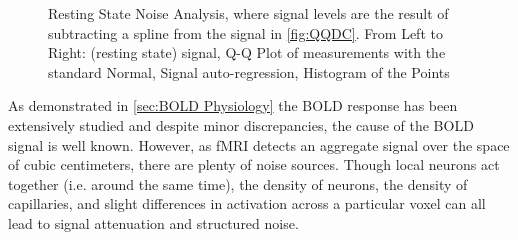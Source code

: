 \begin{figure}
\centering
{}
\caption[Resting State Noise Analysis, After Subtracting Spline]
{Resting State Noise Analysis, where
signal levels are the result of subtracting a spline from the signal in 
\autoref{fig:QQDC}.
From Left to Right:
(resting state) signal, Q-Q Plot of measurements with the standard Normal,
Signal auto-regression, Histogram of the Points}
\label{fig:QQSpline}
\end{figure}

As demonstrated in \autoref{sec:BOLD Physiology} the \ac{BOLD} response has been
extensively studied and despite minor discrepancies, the cause of the \ac{BOLD}
signal is well known. However, as \ac{fMRI} detects an
aggregate signal over the space of cubic centimeters, there are
plenty of noise sources. Though local neurons act
together (i.e. around the same time), the density of neurons, the
density of capillaries, and slight differences in activation across
a particular voxel can all lead to signal attenuation and structured noise.

